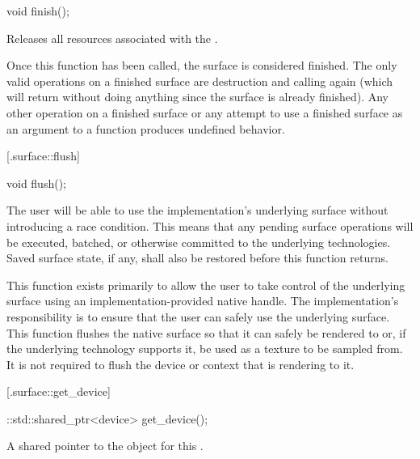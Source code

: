 %
%
\begin{itemdecl}
void finish();
\end{itemdecl}
\begin{itemdescr}
	\pnum
	\effects
	Releases all resources associated with the .
	
	\pnum
	\remarks
	Once this function has been called, the surface is considered finished. The only valid operations on a finished surface are destruction and calling  again (which will return without doing anything since the surface is already finished). Any other operation on a finished surface or any attempt to use a finished surface as an argument to a function produces undefined behavior.
\end{itemdescr}

 [\iotwod.surface::flush] {}

%
%
\begin{itemdecl}
void flush();
\end{itemdecl}
\begin{itemdescr}
	\pnum
	\effects
	The user will be able to use the implementation's underlying surface without introducing a race condition. This means that any pending surface operations will be executed, batched, or otherwise committed to the underlying technologies. Saved surface state, if any, shall also be restored before this function returns.
	
	\pnum
	\remarks
	This function exists primarily to allow the user to take control of the 
	underlying surface using an implementation-provided native handle. The implementation's responsibility is to ensure that the user can safely use the underlying surface.
	\enternote
	This function flushes the native surface so that it can safely be rendered to or, if the underlying technology supports it, be used as a texture to be sampled from. It is not required to flush the device or context that is rendering to it.
	\exitnote
\end{itemdescr}

 [\iotwod.surface::get_device] {}

%
%
\begin{itemdecl}
::std::shared_ptr<device> get_device();
\end{itemdecl}
\begin{itemdescr}
	\pnum
	\returns
	A shared pointer to the  object for this .	
\end{itemdescr}

